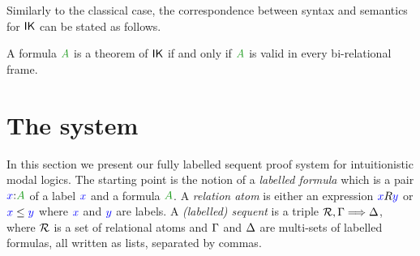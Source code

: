 \documentclass[a4paper]{article}
\begin{document}
 Similarly to the classical case, the correspondence between syntax and semantics for $\mathsf{IK}$ can be stated as follows.
 
 \begin{theorem}\label{thm:plotkin}
 	A formula $\fm A$ is a theorem of $\mathsf{IK}$ if and only if $\fm A$ is valid in every bi-relational frame.
 \end{theorem}
 \section{The system}\label{sec:system}
 
 In this section we present our fully labelled sequent proof system
 for intuitionistic modal logics. The starting point is the notion of a
 \emph{labelled formula} which is a pair $\labels xA$ of a label ${\color{blue}{x}}$ and a formula $\fm A$. 
 A \emph{relation atom} is either an expression
 ${\color{blue}{x}}R{\color{blue}{y}}$ or ${\color{blue}{x}}\le{{\color{blue}{y}}}$ where ${\color{blue}{x}}$ and ${\color{blue}{y}}$ are labels. 
 A \emph{(labelled) sequent} is a triple $\mathcal{R} , \Gamma \Longrightarrow \Delta$,
 where $\mathcal{R}$ is a set of relational atoms and $\Gamma$ and $\Delta$ are multi-sets of labelled formulas, all written as lists, separated by commas.
 
\end{document}
